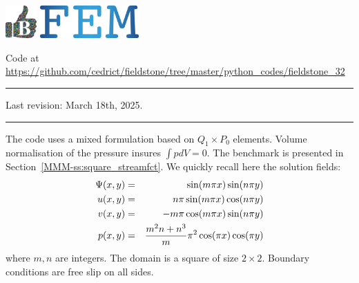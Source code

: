 \includegraphics[height=1.25cm]{images/pictograms/benchmark}
\includegraphics[height=1.25cm]{images/pictograms/FEM}


%

\begin{center}
\inpython
{\small Code at \url{https://github.com/cedrict/fieldstone/tree/master/python_codes/fieldstone_32}}
\end{center}

\par\noindent\rule{\textwidth}{0.4pt}

Last revision: March 18th, 2025.

\par\noindent\rule{\textwidth}{0.4pt}


The code uses a mixed formulation based on $Q_1 \times P_0$ elements.
Volume normalisation of the pressure insures $\int p dV = 0$. 
The benchmark is presented in Section~\ref{MMM-ss:square_streamfct}.
We quickly recall here the solution fields:
\begin{eqnarray}
\Psi(x,y)&=& \sin( m \pi x)\sin( n\pi y) \nonumber\\
u(x,y) &=& n \pi \sin (m\pi x)\cos(n\pi y)\nonumber\\
v(x,y) &=& -m\pi \cos(m\pi x)\sin (n\pi y)\nonumber\\
p(x,y) &=& \frac{m^2n+n^3}{m} \pi^2 \cos (\pi x)\cos(\pi y) \nonumber
\end{eqnarray}
where $m,n$ are integers. The domain is a square of size $2\times 2$.
Boundary conditions are free slip on all sides.

